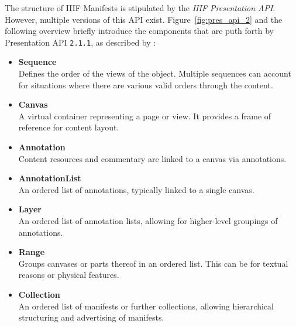 The structure of IIIF Manifests is stipulated by the \textit{IIIF Presentation API}. However, multiple versions of this API exist. Figure~\ref{fig:pres_api_2} and the following overview briefly introduce the components that are puth forth by Presentation API \texttt{2.1.1}, as described by \citet{appleby2017presentation}:
\begin{itemize}
    \item \textbf{Sequence}\\
    Defines the order of the views of the object. Multiple sequences can account for situations where there are various valid orders through the content.
    \item \textbf{Canvas}\\
    A virtual container representing a page or view. It provides a frame of reference for content layout.
    \item \textbf{Annotation}\\
    Content resources and commentary are linked to a canvas via annotations.
    \item \textbf{AnnotationList}\\
    An ordered list of annotations, typically linked to a single canvas.
    \item \textbf{Layer}\\
    An ordered list of annotation lists, allowing for higher-level groupings of annotations.
    \item \textbf{Range}\\
    Groups canvases or parts thereof in an ordered list. This can be for textual reasons or physical features.
    \item \textbf{Collection}\\
    An ordered list of manifests or further collections, allowing hierarchical structuring and advertising of manifests.
\end{itemize}


